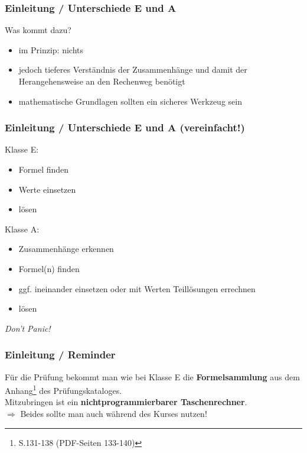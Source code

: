 \begin{frame}
  \frametitle{Einleitung / Unterschiede E und A}

  Was kommt dazu? \\[1em]

  \begin{itemize}
    \item im Prinzip: nichts
    \item jedoch tieferes Verständnis der Zusammenhänge und damit der
      Herangehensweise an den Rechenweg benötigt
    \item mathematische Grundlagen sollten ein sicheres Werkzeug sein
  \end{itemize}

\end{frame}

\begin{frame}
  \frametitle{Einleitung / Unterschiede E und A (vereinfacht!)}

  \vspace{1em}
  Klasse E:

  \begin{itemize}
    \item Formel finden
    \item Werte einsetzen
    \item lösen
  \end{itemize}

  \pause

  Klasse A:

  \begin{itemize}
    \item Zusammenhänge erkennen
    \item Formel(n) finden
    \item ggf. ineinander einsetzen oder mit Werten Teillösungen errechnen
    \item lösen
  \end{itemize}

  \pause

  \begin{center}\Large \emph{Don't Panic!}\end{center}

\end{frame}

\begin{frame}
  \frametitle{Einleitung / Reminder}

  Für die Prüfung bekommt man wie bei Klasse E die
  \textbf{Formelsammlung}\hyperlink{refs}{\cite{mat}} aus dem
  Anhang\footnote{S.131-138 (PDF-Seiten 133-140)} des Prüfungskataloges.\\[1em]

  Mitzubringen ist ein \textbf{nichtprogrammierbarer Taschenrechner}. \\[3em]

  $\Rightarrow$ Beides sollte man auch während des Kurses nutzen!

\end{frame}

